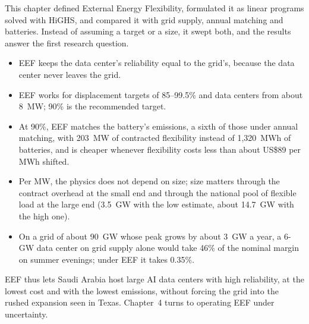 This chapter defined External Energy Flexibility, formulated it as linear programs solved with HiGHS, and compared it with grid supply, annual matching and batteries. Instead of assuming a target or a size, it swept both, and the results answer the first research question.
\begin{itemize}
\item EEF keeps the data center's reliability equal to the grid's, because the data center never leaves the grid.
\item EEF works for displacement targets of 85--99.5\% and data centers from about 8~MW; 90\% is the recommended target.
\item At 90\%, EEF matches the battery's emissions, a sixth of those under annual matching, with 203~MW of contracted flexibility instead of 1,320~MWh of batteries, and is cheaper whenever flexibility costs less than about US\$89 per MWh shifted.
\item Per MW, the physics does not depend on size; size matters through the contract overhead at the small end and through the national pool of flexible load at the large end (3.5~GW with the low estimate, about 14.7~GW with the high one).
\item On a grid of about 90~GW whose peak grows by about 3~GW a year, a 6-GW data center on grid supply alone would take 46\% of the nominal margin on summer evenings; under EEF it takes 0.35\%.
\end{itemize}
EEF thus lets Saudi Arabia host large AI data centers with high reliability, at the lowest cost and with the lowest emissions, without forcing the grid into the rushed expansion seen in Texas. Chapter~4 turns to operating EEF under uncertainty.
